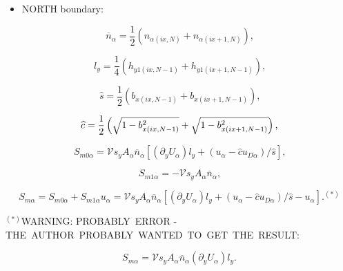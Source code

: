 \documentclass[11pt]{article}
\begin{document}
\bigskip

\begin{itemize}
\item  NORTH boundary:
\end{itemize}

\begin{equation}
\overline{n}_{\alpha}=\frac{1}{2}\left( n_{\alpha\left( ix,N\right)
}+n_{\alpha\left( ix+1,N\right) }\right) \text{,}   \label{c79}
\end{equation}

\begin{equation}
l_{y}=\frac{1}{4}\left( h_{y1\left( ix,N-1\right) }+h_{y1\left(
ix+1,N-1\right) }\right) \text{,}   \label{c80}
\end{equation}

\begin{equation}
\widehat{s}=\frac{1}{2}\left( b_{x\left( ix,N-1\right) }+b_{x\left(
ix+1,N-1\right) }\right) \text{,}   \label{c81}
\end{equation}

\begin{equation}
\widehat{c}=\frac{1}{2}\left( \sqrt{1-b_{x\left( ix,N-1\right) }^{2}}+\sqrt{%
1-b_{x\left( ix+1,N-1\right) }^{2}}\right) \text{,}   \label{c82}
\end{equation}

\begin{equation}
S_{m0\alpha}=\mathcal{V}s_{y}A_{\alpha}\overline{n}_{\alpha}\left[ \left(
\partial_{y}U_{\alpha}\right) l_{y}+\left( u_{\alpha}-\widehat{c}u_{D\alpha
}\right) /\widehat{s}\right] \text{,}   \label{c83}
\end{equation}

\begin{equation}
S_{m1\alpha}=-\mathcal{V}s_{y}A_{\alpha}\overline{n}_{\alpha}\text{,} 
\label{c84}
\end{equation}

\begin{equation}
S_{m\alpha}=S_{m0\alpha}+S_{m1\alpha}u_{\alpha}=\mathcal{V}s_{y}A_{\alpha }%
\overline{n}_{\alpha}\left[ \left( \partial_{y}U_{\alpha}\right)
l_{y}+\left( u_{\alpha}-\widehat{c}u_{D\alpha}\right) /\widehat{s}-u_{\alpha}%
\right] \text{.}^{\left( \ast\right) }   \label{cc85}
\end{equation}

\bigskip

$^{\left( \ast\right) }$WARNING: PROBABLY\ ERROR - THE\ AUTHOR\ PROBABLY\
WANTED\ TO\ GET\ THE\ RESULT:

\begin{equation*}
S_{m\alpha}=\mathcal{V}s_{y}A_{\alpha}\overline{n}_{\alpha}\left(
\partial_{y}U_{\alpha}\right) l_{y}\text{.}
\end{equation*}
\end{document}
